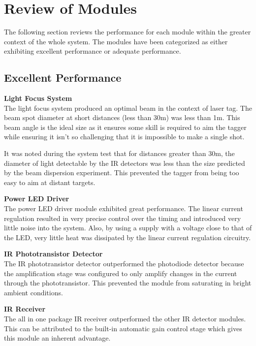 \section{Review of Modules}
The following section reviews the performance for each module within the greater context of the whole system. The modules have been categorized as either exhibiting excellent performance or adequate performance.




\subsection{Excellent Performance}

\textbf{Light Focus System}\\
The light focus system produced an optimal beam in the context of laser tag. The beam spot diameter at short distances (less than 30m) was less than 1m. This beam angle is the ideal size as it ensures some skill is required to aim the tagger while ensuring it isn't so challenging that it is impossible to make a single shot.

It was noted during the system test that for distances greater than 30m, the diameter of light detectable by the IR detectors was less than the size predicted by the beam dispersion experiment. This prevented the tagger from being too easy to aim at distant targets.

\textbf{Power LED Driver}\\
The power LED driver module exhibited great performance. The linear current regulation resulted in very precise control over the timing and introduced very little noise into the system. Also, by using a supply with a voltage close to that of the LED, very little heat was dissipated by the linear current regulation circuitry.

\textbf{IR Phototransistor Detector}\\
The IR phototransistor detector outperformed the photodiode detector because the amplification stage was configured to only amplify changes in the current through the phototransistor. This prevented the module from saturating in bright ambient conditions.

\textbf{IR Receiver}\\
The all in one package IR receiver outperformed the other IR detector modules. This can be attributed to the built-in automatic gain control stage which gives this module an inherent advantage.

